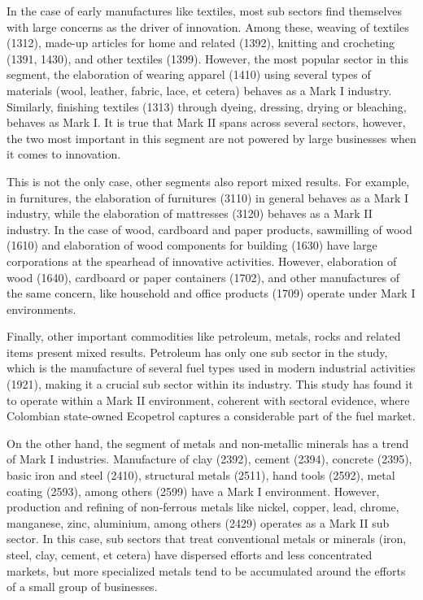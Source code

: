 \documentclass[12pt,a4paper]{article}
\begin{document}
In the case of early manufactures like textiles, most sub sectors find themselves with large concerns as the driver of innovation. Among these, weaving of textiles (1312), made-up articles for home and related (1392), knitting and crocheting (1391, 1430), and other textiles (1399). However, the most popular sector in this segment, the elaboration of wearing apparel (1410) using several types of materials (wool, leather, fabric, lace, et cetera) behaves as a Mark I industry. Similarly, finishing textiles (1313) through dyeing, dressing, drying or bleaching, behaves as Mark I. It is true that Mark II spans across several sectors, however, the two most important in this segment are not powered by large businesses when it comes to innovation.  

This is not the only case, other segments also report mixed results. For example, in furnitures, the elaboration of furnitures (3110) in general behaves as a Mark I industry, while the elaboration of mattresses (3120) behaves as a Mark II industry. In the case of wood, cardboard and paper products, sawmilling of wood (1610) and elaboration of wood components for building (1630) have large corporations at the spearhead of innovative activities. However, elaboration of wood (1640), cardboard or paper containers (1702), and other manufactures of the same concern, like household and office products (1709) operate under Mark I environments. 

Finally, other important commodities like petroleum, metals, rocks and related items present mixed results. Petroleum has only one sub sector in the study, which is the manufacture of several fuel types used in modern industrial activities (1921), making it a crucial sub sector within its industry. This study has found it to operate within a Mark II environment, coherent with sectoral evidence, where Colombian state-owned Ecopetrol captures a considerable part of the fuel market. 

On the other hand, the segment of metals and non-metallic minerals has a trend of Mark I industries. Manufacture of clay (2392), cement (2394), concrete (2395), basic iron and steel (2410), structural metals (2511), hand tools (2592), metal coating (2593), among others (2599) have a Mark I environment. However, production and refining of non-ferrous metals like nickel, copper, lead, chrome, manganese, zinc, aluminium, among others (2429) operates as a Mark II sub sector. In this case, sub sectors that treat conventional metals or minerals (iron, steel, clay, cement, et cetera) have dispersed efforts and less concentrated markets, but more specialized metals tend to be accumulated around the efforts of a small group of businesses.
\end{document}
